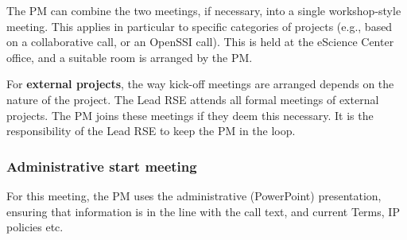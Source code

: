 \documentclass[11pt]{article}
\begin{document}
The PM can combine the two meetings, if necessary, into a single workshop-style meeting. This applies in particular to
specific categories of projects (e.g., based on a collaborative call, or an OpenSSI call). This is held at the eScience
Center office, and a suitable room is arranged by the PM.

For \textbf{external projects}, the way kick-off meetings are arranged depends on the nature of the project. The Lead
RSE attends all formal meetings of external projects. The PM joins these meetings if they deem this necessary. It is
the responsibility of the Lead RSE to keep the PM in the loop.

\subsubsection{Administrative start meeting}



For this meeting, the PM uses the administrative (PowerPoint) presentation, ensuring that information is in the line
with the call text, and current Terms, IP policies etc.
\end{document}
